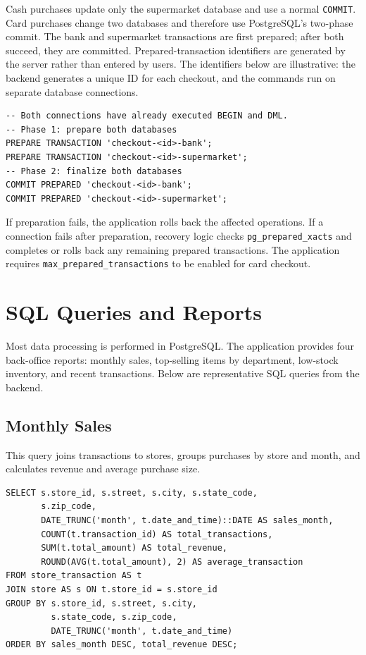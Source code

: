 \documentclass[11pt,letterpaper]{article}
\begin{document}
Cash purchases update only the supermarket database and use a normal \texttt{COMMIT}. Card purchases change two databases and therefore use PostgreSQL's two-phase commit. The bank and supermarket transactions are first prepared; after both succeed, they are committed. Prepared-transaction identifiers are generated by the server rather than entered by users. The identifiers below are illustrative: the backend generates a unique ID for each checkout, and the commands run on separate database connections.

\begin{lstlisting}
-- Both connections have already executed BEGIN and DML.
-- Phase 1: prepare both databases
PREPARE TRANSACTION 'checkout-<id>-bank';
PREPARE TRANSACTION 'checkout-<id>-supermarket';
-- Phase 2: finalize both databases
COMMIT PREPARED 'checkout-<id>-bank';
COMMIT PREPARED 'checkout-<id>-supermarket';
\end{lstlisting}

If preparation fails, the application rolls back the affected operations. If a connection fails after preparation, recovery logic checks \texttt{pg\_prepared\_xacts} and completes or rolls back any remaining prepared transactions. The application requires \texttt{max\_prepared\_transactions} to be enabled for card checkout.

\section{SQL Queries and Reports}

Most data processing is performed in PostgreSQL. The application provides four back-office reports: monthly sales, top-selling items by department, low-stock inventory, and recent transactions. Below are representative SQL queries from the backend.

\subsection{Monthly Sales}

This query joins transactions to stores, groups purchases by store and month, and calculates revenue and average purchase size.

\begin{lstlisting}
SELECT s.store_id, s.street, s.city, s.state_code,
       s.zip_code,
       DATE_TRUNC('month', t.date_and_time)::DATE AS sales_month,
       COUNT(t.transaction_id) AS total_transactions,
       SUM(t.total_amount) AS total_revenue,
       ROUND(AVG(t.total_amount), 2) AS average_transaction
FROM store_transaction AS t
JOIN store AS s ON t.store_id = s.store_id
GROUP BY s.store_id, s.street, s.city,
         s.state_code, s.zip_code,
         DATE_TRUNC('month', t.date_and_time)
ORDER BY sales_month DESC, total_revenue DESC;
\end{lstlisting}
\end{document}
